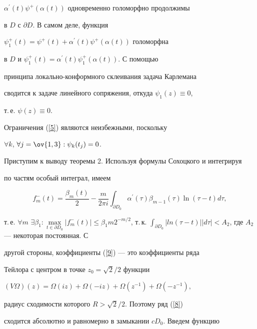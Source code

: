 $\alpha^\prime(t)\psi^+(\alpha(t))$ одновременно голоморфно продолжимы


в $D$ с $\partial D$. В самом деле, функция


$\psi_1^+(t)=\psi^+(t)+\alpha^\prime(t) \psi^+(\alpha(t))$ голоморфна


в $D$ и $\psi_1^+(t)=\alpha^\prime(t) \psi_1^+(\alpha(t))$. С помощью


принципа локально-конформного склеивания \cite{Zver} задача Карлемана


сводится к задаче линейного сопряжения, откуда $\psi_1(z)\equiv 0$,


т.\,е. $\psi(z)\equiv 0$.





\begin{note}


Ограничения (\ref{5}) являются неизбежными, поскольку


$\forall k$, $\forall j=\ov{1,3}: \psi_k(t_j)=0$.


\end{note}





Приступим к выводу теоремы 2. Используя формулы Сохоцкого и интегрируя


по частям особый интеграл, имеем


$$


f_m^-(t)=\frac{\beta_m(t)}{2}-\frac{m}{2\pi i}\int_{\partial D_0}


\alpha^\prime(\tau)\beta_{m-1}(\tau)\ln(\tau-t)d\tau,


$$


т.\,е. $\forall m$ $\exists\beta_1 : \max\limits_{t\in \partial D_0}


|f^-_m(t)|\le\beta_1m2^{-m/2}$, т.\,к. $\displaystyle\int_{\partial


D_0}|ln(\tau-t)| |d\tau| <A_2$, где $A_2$ --- некоторая постоянная. С


другой стороны, коэффициенты (\ref{9}) --- это коэффициенты ряда


Тейлора с центром в точке $z_0=\sqrt2/2$ функции


$(V\Omega)(z)=\Omega(iz)+\Omega(-iz)+\Omega(z^{-1})+\Omega(-z^{-1}), $


радиус сходимости которого $R>\sqrt2/2$. Поэтому ряд (\ref{8})


сходится абсолютно и равномерно в замыкании $cD_0$. Введем функцию


$$


